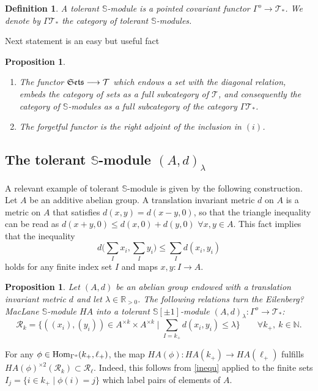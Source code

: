 \documentclass[cupthm]{CUP-JNL-JMJ}
\numberwithin{equation}{section}
\theoremstyle{cupplain}
\newtheorem{proposition}[theorem]{Proposition}
\theoremstyle{cupdefinition}
\newtheorem{definition}{Definition}[section]
\theoremstyle{cupremark}
\theoremstyle{cupproof}
\def\N{{\mathbb N}}
\def\R{{\mathbb R}}
\def\S{{\mathbb S}}
\def\cR{{\mathcal R}}
\def\cT{{\mathcal T}}
\def\sss{{\S}}
\def\spm{{\sss[\pm 1]}}
\def\Se{\frak{ Sets}}
\def\Hom {{\rm{Hom}}}
\def\gop{{\Gamma^{o}}}
\begin{document}
\begin{appendix}
\begin{definition} \label{cT} A tolerant $\sss$-module is  a pointed covariant functor $\gop \longrightarrow \cT_*$.
We denote by $\Gamma\cT_*$ the category of tolerant $\sss$-modules.
\end{definition}

Next statement is an easy but useful fact

\begin{proposition}\label{adjoint} 
\begin{enumerate}
\item[(i)] The functor $\Se\longrightarrow \cT$ which endows a set with the diagonal relation, embeds the category of sets as a full subcategory of $\cT$, and consequently the category of $\sss$-modules  as a full subcategory of the category $\Gamma\cT_*$.
\item[(ii)] The forgetful functor is the right adjoint of the inclusion in $(i)$.	
\end{enumerate}
\end{proposition}

\subsection{The tolerant $\sss$-module $(A,d)_\lambda$}

 A relevant example of tolerant $\sss$-module is given by the following construction. Let $A$ be an additive abelian group. A translation invariant metric $d$ on $A$ is a metric on $A$ that satisfies $d(x,y)=d(x-y,0)$, so that the triangle inequality can be  read as $d(x+y,0)\leq d(x,0)+d(y,0)$ $\forall x,y \in A$. This fact implies that the inequality 
\begin{equation}\label{inequ}
d\bigg(\sum_I x_i,\sum_I y_i\bigg)\leq \sum_I d(x_i,y_i)
\end{equation}
holds for any finite index set $I$ and maps $x, y:I\to A$.

\begin{proposition}\label{defnA} Let $(A,d)$ be an abelian group endowed with a translation invariant metric $d$ and let $\lambda\in \R_{>0}$. The following relations   turn the Eilenberg?MacLane $\sss$-module $HA$ into a tolerant $\spm$-module $(A,d)_\lambda: \gop\longrightarrow \cT_*$:
\begin{equation}\label{inequdef} \mathcal R_k= \{((x_i),(y_i))\in A^{\times k}\times A^{\times k}\mid \sum_{I=k_+} d(x_i,y_i)\leq \lambda \}\qquad \forall k_+,~k\in\N.
\end{equation}
\end{proposition}
\proof For any $\phi\in \Hom_\gop(k_+,\ell_+)$, the map $HA(\phi):HA(k_+)\to HA(\ell_+)$ fulfills $HA(\phi)^{\times 2}(\cR_k)\subset \cR_\ell$. Indeed, this follows from \eqref{inequ} applied to the finite sets $I_j=\{i\in k_+\mid \phi(i)=j\}$ which label pairs of elements of $A$. \endproof 


\end{appendix}
\end{document}

